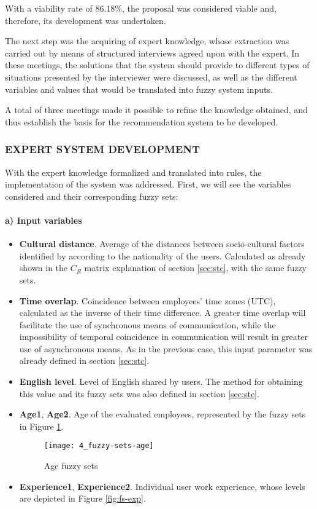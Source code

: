 With a viability rate of 86.18\%, the proposal was considered viable and, therefore, its development was undertaken.

The next step was the acquiring of expert knowledge, whose extraction was carried out by means of structured interviews agreed upon with the expert. In these meetings, the solutions that the system should provide to different types of situations presented by the interviewer were discussed, as well as the different variables and values that would be translated into fuzzy system inputs.

A total of three meetings made it possible to refine the knowledge obtained, and thus establish the basis for the recommendation system to be developed.

\subsubsection{EXPERT SYSTEM DEVELOPMENT}

With the expert knowledge formalized and translated into rules, the implementation of the system was addressed. First, we will see the variables considered and their corresponding fuzzy sets:

\paragraph{a) Input variables}

\begin{itemize}
\item \textbf{Cultural distance}. Average of the distances between socio-cultural factors identified by \cite{hofstede_cultures_2004} according to the nationality of the users. Calculated as already shown in the $C_R$ matrix explanation of section \ref{sec:stc}, with the same fuzzy sets.
\item \textbf{Time overlap}.  Coincidence between employees’ time zones (UTC), calculated as the inverse of their time difference. A greater time overlap will facilitate the use of synchronous means of communication, while the impossibility of temporal coincidence in communication will result in greater use of asynchronous means. As in the previous case, this input parameter was already defined in section \ref{sec:stc}.
\item \textbf{English level}. Level of English shared by users. The method for obtaining this value and its fuzzy sets was also defined in section \ref{sec:stc}.
\item \textbf{Age1}, \textbf{Age2}. Age of the evaluated employees, represented by the fuzzy sets in Figure \ref{fig:fs-age}.

	\begin{figure}
		\centering
		\texttt{[image: 4\_fuzzy-sets-age]}
		\caption[Age fuzzy sets]{Age fuzzy sets}
		\label{fig:fs-age}
	\end{figure}

\item \textbf{Experience1}, \textbf{Experience2}. Individual user work experience, whose levels are depicted in Figure \ref{fig:fs-exp}.
\end{itemize}


